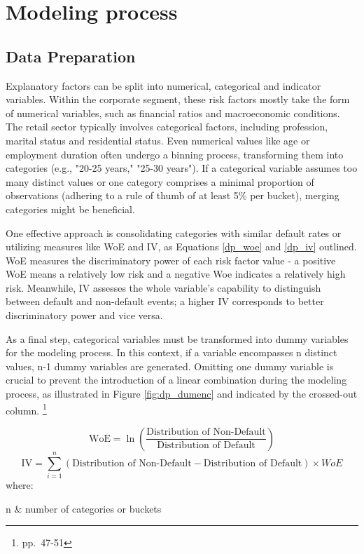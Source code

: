 \chapter{Modeling process}
\label{ch:MP}

\section{Data Preparation}
\label{sec:dataprep}
Explanatory factors can be split into numerical, categorical and indicator variables. Within the corporate segment, these risk factors mostly take the form of numerical variables, such as financial ratios and macroeconomic conditions. The retail sector typically involves categorical factors, including profession, marital status and residential status. Even numerical values like age or employment duration often undergo a binning process, transforming them into categories (e.g., "20-25 years," "25-30 years"). If a categorical variable assumes too many distinct values or one category comprises a minimal proportion of observations (adhering to a rule of thumb of at least 5\% per bucket), merging categories might be beneficial.

One effective approach is consolidating categories with similar default rates or utilizing measures like \ac{WoE} and \ac{IV}, as Equations \ref{dp_woe} and \ref{dp_iv} outlined. WoE measures the discriminatory power of each risk factor value - a positive WoE means a relatively low risk and a negative Woe indicates a relatively high risk. Meanwhile, IV assesses the whole variable's capability to distinguish between default and non-default events; a higher IV corresponds to better discriminatory power and vice versa.

As a final step, categorical variables must be transformed into dummy variables for the modeling process. In this context, if a variable encompasses n distinct values, n-1 dummy variables are generated. Omitting one dummy variable is crucial to prevent the introduction of a linear combination during the modeling process, as illustrated in Figure \ref{fig:dp_dumenc} and indicated by the crossed-out column. \footnote{\cite{Witzany:2017} pp.~47-51}

\begin{equation}
\text{WoE} = \ln\left(\frac{\text{Distribution of Non-Default}}{\text{Distribution of Default}}\right) \label{dp_woe}
\end{equation}
\begin{equation}
\text{IV} = \sum_{i=1}^{n} (\text{Distribution of Non-Default} - \text{Distribution of Default}) \times WoE \label{dp_iv}
\end{equation}
where:
\begin{conditions}
n  	& number of categories or buckets 
\end{conditions}

